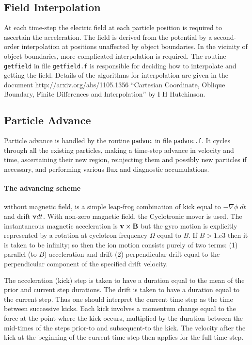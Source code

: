 \documentclass[12pt]{article}
\begin{document}
\subsection{Field Interpolation}

At each time-step the electric field at each particle position is
required to ascertain the acceleration. The field is derived from the
potential by a second-order interpolation at positions unaffected by
object boundaries. In the vicinity of object boundaries, more
complicated interpolation is required. The routine \verb!getfield! in
file \verb!getfield.f! is responsible for deciding how to interpolate
and getting the field. Details of the algorithms for interpolation are
given in the document http://arxiv.org/abs/1105.1356 ``Cartesian
Coordinate, Oblique Boundary, Finite Differences and Interpolation''
by I H Hutchinson.

\subsection{Particle Advance}

Particle advance is handled by the routine \verb!padvnc! in file
\verb!padvnc.f!. It cycles through all the existing particles, making
a time-step advance in velocity and time, ascertaining their new
region, reinjecting them and possibly new particles if necessary, and
performing various flux and diagnostic accumulations.

\paragraph{The advancing scheme} without magnetic field, is a simple
leap-frog combination of kick equal to $-\nabla\phi\;dt$ and drift
${\bf v} dt$. With non-zero magnetic field, the Cyclotronic mover is
used. The instantaneous magnetic acceleration is ${\bf v}\times{\bf
  B}$ but the gyro motion is explicitly represented by a rotation at
cyclotron frequency $\Omega$ equal to $B$. If $B> 1.e3$ then it is
taken to be infinity; so then the ion motion consists purely of two
terms: (1) parallel (to $B$) acceleration and drift (2) perpendicular
drift equal to the perpendicular component of the specified drift velocity.

The
acceleration (kick) step is taken to have a duration equal to the mean
of the prior and current step durations. The drift is taken to have a
duration equal to the current step. Thus one should interpret the
current time step as the time between successive kicks. Each kick
involves a momentum change equal to the force at the point where the
kick occurs, multiplied by the duration between the mid-times of the
steps prior-to and subsequent-to the kick. The velocity after the kick
at the beginning of the current time-step then applies for the full
time-step. 
\end{document}
